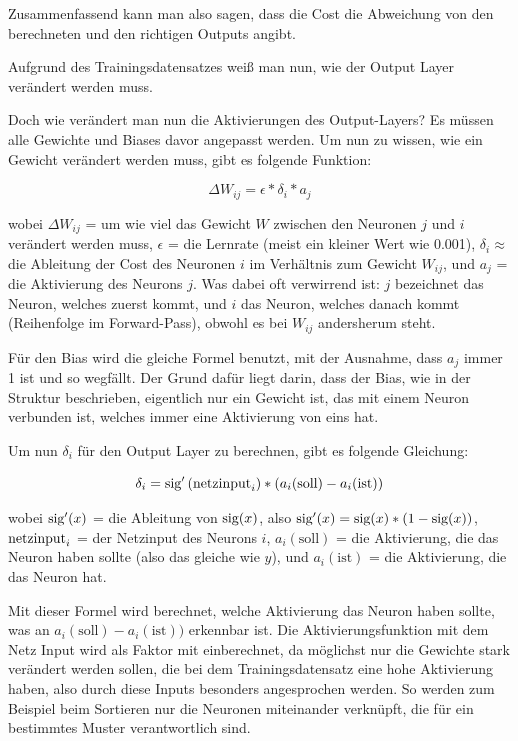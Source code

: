 \documentclass{scrartcl}
\begin{document}
	Zusammenfassend kann man also sagen, dass die Cost die Abweichung von den berechneten und den richtigen Outputs angibt.
	
	Aufgrund des Trainingsdatensatzes weiß man nun, wie der Output Layer verändert werden
	muss.


	Doch wie verändert man nun die Aktivierungen des Output-Layers? Es müssen alle Gewichte und Biases davor angepasst werden. Um nun zu wissen, wie ein Gewicht verändert werden muss, gibt es folgende Funktion:

	{\Large \[
		\Delta W_{ij} = \epsilon * \delta_i * a_j
	\]}

	wobei $\Delta W_{ij}$ = um wie viel das Gewicht $W$ zwischen den Neuronen $j$ und $i$ verändert werden muss, $\epsilon$ = die Lernrate (meist ein kleiner Wert wie 0.001), $\delta_i \approx$ die Ableitung der Cost des Neuronen $i$ im Verhältnis zum Gewicht $W_{ij}$, und $a_j$ = die Aktivierung des Neurons $j$. Was dabei oft verwirrend ist: $j$ bezeichnet das Neuron, welches zuerst kommt, und $i$ das Neuron, welches danach kommt (Reihenfolge im Forward-Pass), obwohl es bei $W_{ij}$ andersherum steht.

	Für den Bias wird die gleiche Formel benutzt, mit der Ausnahme, dass $a_j$ immer 1 ist und so wegfällt. Der Grund dafür liegt darin, dass der Bias, wie in der Struktur beschrieben, eigentlich nur ein Gewicht ist, das mit einem Neuron verbunden ist, welches immer eine Aktivierung von eins hat.

	Um nun $\delta_i$ für den Output Layer zu berechnen, gibt es folgende Gleichung: 

	{\Large \[
		\delta_i = \textrm{sig} '\left({\textrm{netzinput}}_i\right) * (a_i (\textrm{soll}) - a_i (\textrm{ist})) 
	\]}

	wobei $\textrm{sig} '(x)$ = die Ableitung von $\textrm{sig}(x)$, also $\textrm{sig}'(x) = \textrm{sig}(x) * (1 - \textrm{sig}(x))$, $\textrm{netzinput}_i$ = der Netzinput des Neurons $i$, $a_i(\textrm{soll})$ = die Aktivierung, die das Neuron haben sollte (also das gleiche wie $y$), und $a_i(\textrm{ist})$ = die Aktivierung, die das Neuron hat.

	Mit dieser Formel wird berechnet, welche Aktivierung das Neuron haben sollte, was an $a_i(\textrm{soll}) - a_i(\textrm{ist}))$ erkennbar ist. Die Aktivierungsfunktion mit dem Netz Input wird als Faktor mit einberechnet, da möglichst nur die Gewichte stark verändert werden sollen, die bei dem Trainingsdatensatz eine hohe Aktivierung haben, also durch diese Inputs besonders angesprochen werden. So werden zum Beispiel beim Sortieren nur die Neuronen miteinander verknüpft, die für ein bestimmtes Muster verantwortlich sind.
	
\end{document}
